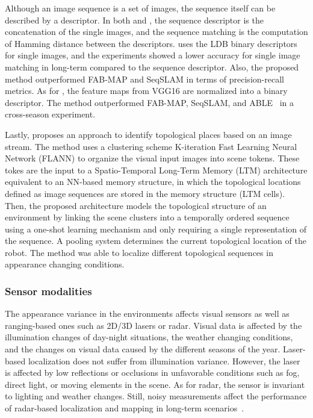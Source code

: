 Although an image sequence is a set of images, the sequence itself can be described by a descriptor. In both \cite{arroyo-et-al:2018:7} and \cite{zhu-et-al:2018:8500686}, the sequence descriptor is the concatenation of the single images, and the sequence matching is the computation of Hamming distance between the descriptors. \cite{arroyo-et-al:2018:7} uses the LDB binary descriptors for single images, and the experiments showed a lower accuracy for single image matching in long-term compared to the sequence descriptor. Also, the proposed method outperformed FAB-MAP and SeqSLAM in terms of precision-recall metrics.
As for \cite{zhu-et-al:2018:8500686}, the feature maps from VGG16 are normalized into a binary descriptor. The method outperformed FAB-MAP, SeqSLAM, and ABLE~\parencite{arroyo-et-al:2018:7} in a cross-season experiment.

Lastly, \cite{nguyen-et-al:2013:004} proposes an approach to identify topological places based on an image stream. 
The method uses a clustering scheme K-iteration Fast Learning Neural Network (FLANN) to organize the visual input images into scene tokens. These tokes are the input to a Spatio-Temporal Long-Term Memory (LTM) architecture equivalent to an NN-based memory structure, in which the topological locations defined as image sequences are stored in the memory structure (LTM cells). Then, the proposed architecture models the topological structure of an environment by linking the scene clusters into a temporally ordered sequence using a one-shot learning mechanism and only requiring a single representation of the sequence.
A pooling system determines the current topological location of the robot.
The method was able to localize different topological sequences in appearance changing conditions.




\subsubsection{Sensor modalities}

The appearance variance in the environments affects visual sensors as well as ranging-based ones such as 2D/3D lasers or radar. Visual data is affected by the illumination changes of day-night situations, the weather changing conditions, and the changes on visual data caused by the different seasons of the year. Laser-based localization does not suffer from illumination variance. However, the laser is affected by low reflections or occlusions  in unfavorable conditions such as fog, direct light, or moving elements in the scene. As for radar, the sensor is invariant to lighting and weather changes. Still, noisy measurements affect the performance of radar-based localization and mapping in long-term scenarios~\parencite{yin-et-al:2021:661199}.

